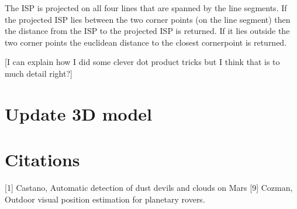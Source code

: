The ISP is projected on all four lines that are spanned by the line segments.
If the projected ISP lies between the two corner points (on the line segment) then the distance from the ISP to the projected ISP is returned.
If it lies outside the two corner points the euclidean distance to the closest cornerpoint is returned.

[I can explain how I did some clever dot product tricks but I think that is to much detail right?]


\section{Update 3D model}


\section{Citations}
[1] Castano, Automatic detection of dust devils and clouds on Mars
[9] Cozman, Outdoor visual position estimation for planetary rovers.
